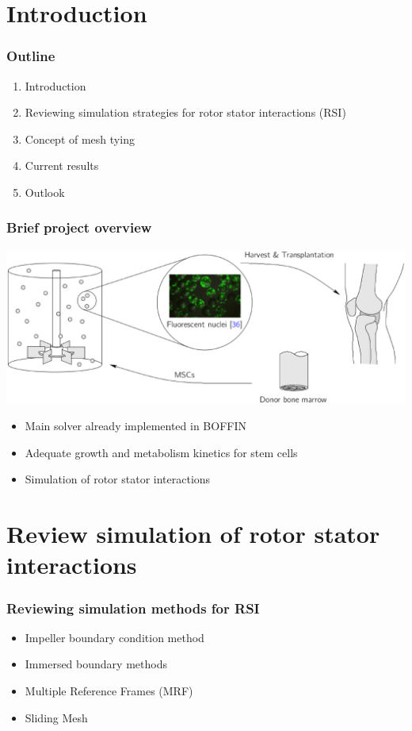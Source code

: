 \documentclass[10pt,xcolor=dvipsnames]{beamer}
\begin{document}
\section{Introduction}
\begin{frame}[t]

  \frametitle{Outline}
  \vfill
  \begin{enumerate}
   \item Introduction
   \item Reviewing simulation strategies for rotor stator interactions (RSI)
   \item Concept of mesh tying
   \item Current results
   \item Outlook
  \end{enumerate}
  \vfill
\end{frame}

\begin{frame}[t]

  \frametitle{Brief project overview}
  \vfill
    \includegraphics[width=\columnwidth]{fig/overview.eps}
    \begin{itemize}
    \item Main solver already implemented in BOFFIN
    \item Adequate growth and metabolism kinetics for stem cells
    \item Simulation of rotor stator interactions
  \end{itemize}
  \vfill
\end{frame}

\section{Review simulation of rotor stator interactions}
\begin{frame}[t]
\frametitle{Reviewing simulation methods for RSI}
\vfill
  \begin{itemize}
    \item Impeller boundary condition method
    \item Immersed boundary methods
    \end{itemize}
    \begin{snugshade}
    \begin{itemize}
    \item Multiple Reference Frames (MRF)
    \item Sliding Mesh
  \end{itemize}
  \end{snugshade}
  \vfill
\end{frame}
\end{document}
